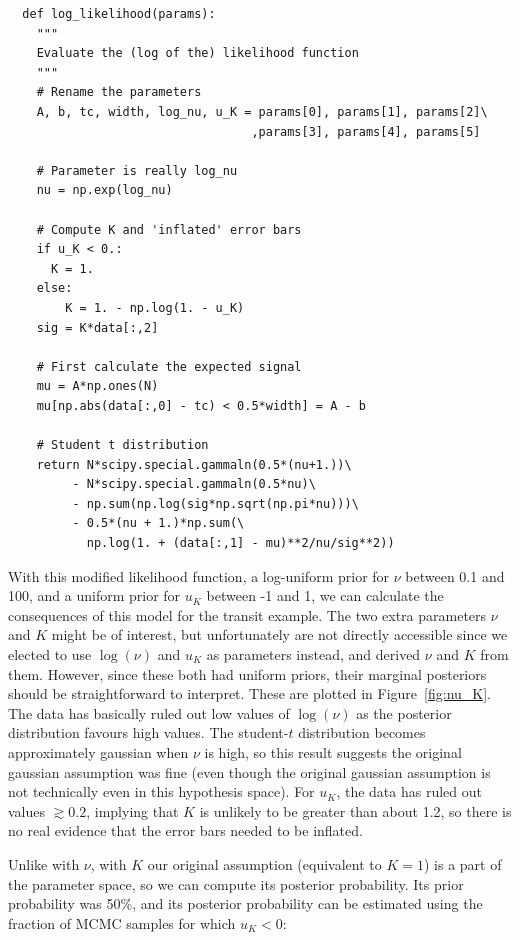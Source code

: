 \begin{verbatim}
  def log_likelihood(params):
    """
    Evaluate the (log of the) likelihood function
    """
    # Rename the parameters
    A, b, tc, width, log_nu, u_K = params[0], params[1], params[2]\
                                  ,params[3], params[4], params[5]

    # Parameter is really log_nu
    nu = np.exp(log_nu)

    # Compute K and 'inflated' error bars
    if u_K < 0.:
      K = 1.
    else:
        K = 1. - np.log(1. - u_K)
    sig = K*data[:,2]

    # First calculate the expected signal
    mu = A*np.ones(N)
    mu[np.abs(data[:,0] - tc) < 0.5*width] = A - b

    # Student t distribution
    return N*scipy.special.gammaln(0.5*(nu+1.))\
         - N*scipy.special.gammaln(0.5*nu)\
         - np.sum(np.log(sig*np.sqrt(np.pi*nu)))\
         - 0.5*(nu + 1.)*np.sum(\
           np.log(1. + (data[:,1] - mu)**2/nu/sig**2))
\end{verbatim}

With this modified likelihood function, a log-uniform prior for $\nu$ between
0.1 and 100, and a uniform prior for $u_K$ between -1 and 1, we can
calculate the consequences of this model for the transit example. The two
extra parameters $\nu$ and $K$ might be of interest, but unfortunately are not
directly accessible since we elected to use $\log(\nu)$ and $u_K$ as
parameters instead, and derived $\nu$ and $K$ from them.
However, since these both had uniform priors, their marginal posteriors
should be straightforward to interpret. These are plotted in
Figure~\ref{fig:nu_K}. The data has basically ruled out low values of
$\log(\nu)$ as the posterior distribution favours high values. The student-$t$
distribution becomes approximately gaussian when $\nu$ is high, so this result
suggests the original gaussian assumption was fine
(even though the original gaussian assumption is not technically even
in this hypothesis space). For $u_K$, the data has ruled out values
$\gtrsim 0.2$, implying that $K$ is unlikely to be greater than about 1.2,
so there is no real evidence that the error bars needed to be inflated.

Unlike with $\nu$, with $K$ our original assumption (equivalent to $K=1$)
is a part of the parameter space, so we can compute its posterior probability.
Its prior probability was 50\%, and its posterior probability can be
estimated using the fraction of MCMC samples for which $u_K < 0$:

